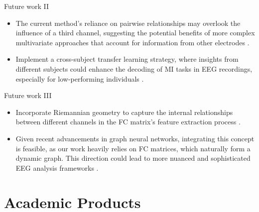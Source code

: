 \documentclass[aspectratio=169]{beamer}
\let\oldcite\cite %
\renewcommand{\cite}[1]{{\tiny\oldcite{#1}}}
\begin{document}
\begin{frame}{Future work II}
    \begin{itemize}
        \item The current method's reliance on pairwise relationships may overlook the influence of a third channel, suggesting the potential benefits of more complex multivariate approaches that account for information from other electrodes \cite{vidaurre2023novel}.
        \vspace{2em}
        \item Implement a cross-subject transfer learning strategy, where insights from different subjects could enhance the decoding of MI tasks in EEG recordings, especially for low-performing individuals \cite{wei2023sub}.
    \end{itemize}
\end{frame}

\begin{frame}{Future work III}
    \begin{itemize}
        \item Incorporate Riemannian geometry to capture the internal relationships between different channels in the FC matrix's feature extraction process \cite{carrara2023classification}.
        \vspace{2em}
        \item Given recent advancements in graph neural networks, integrating this concept is feasible, as our work heavily relies on FC matrices, which naturally form a dynamic graph. This direction could lead to more nuanced and sophisticated EEG analysis frameworks \cite{ma2023double}.
    \end{itemize}
\end{frame}

\section{Academic Products}
\end{document}
